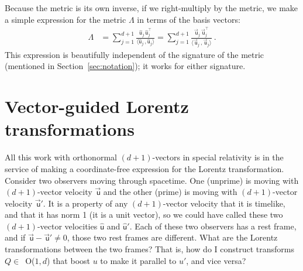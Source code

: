 \documentclass{article}
\newcommand\upvec[1]{\!\vec{\,\mathrm{#1}}}
\newcommand{\Lvec}[1]{\upvec{\mathsf{#1}}} %
\newcommand{\Lhat}[1]{\hat{\mathsf{#1}}} %
\newcommand{\inner}[2]{\langle{#1}\,,{#2}\rangle}
\newcommand{\plus}{\!+\!} %
\newcommand{\secref}[1]{Section~\ref{#1}}
\begin{document}
Because the metric is its own inverse, if we right-multiply by the metric, we make a simple expression for the metric $\Lambda$ in terms of the basis vectors:
\begin{align}
    \Lambda &= \sum_{j=1}^{d+1} \frac{\Lhat{u}_j\,\Lhat{u}_j^\top}{\inner{\Lhat{u}_j}{\Lhat{u}_j}} = \sum_{j=1}^{d+1} \frac{\Lvec{u}_j\,\Lvec{u}_j^\top}{\inner{\Lvec{u}_j}{\Lvec{u}_j}} ~.
\end{align}
This expression is beautifully independent of the signature of the metric (mentioned in \secref{sec:notation}); it works for either signature.

\section{Vector-guided Lorentz transformations}\label{sec:lt}

All this work with orthonormal $(d\plus1)$-vectors in special relativity is in the service of making a coordinate-free expression for the Lorentz transformation.
Consider two observers moving through spacetime.
One (unprime) is moving with $(d\plus1)$-vector velocity $\Lvec{u}$ and the other (prime) is moving with $(d\plus1)$-vector velocity $\Lvec{u}'$.
It is a property of any $(d\plus1)$-vector velocity that it is timelike, and that it has norm 1 (it is a unit vector), so we could have called these two $(d\plus1)$-vector velocities $\Lhat{u}$ and $\Lhat{u}'$.
Each of these two observers has a rest frame, and if $\Lvec{u}-\Lvec{u}'\neq 0$, those two rest frames are different.
What are the Lorentz transformations between the two frames?
That is, how do I construct transforms $Q\in$~O($1,d$) that boost $u$ to make it parallel to $u'$, and vice versa?
\end{document}
